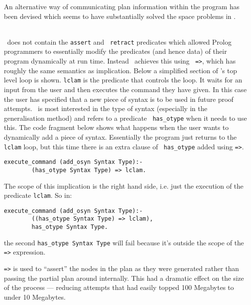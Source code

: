 An alternative way of communicating plan information within the
program has been devised which seems to have substantially solved the
space problems in \lclam.

 \\

\lprolog\ does not contain the {\tt assert} and {\tt
  retract} predicates which allowed Prolog programmers
to essentially modify the predicates (and hence data) of their program
dynamically at run time.  Instead \lprolog\ achieves this using {\tt
  =>}\index{{\tt =>}}, which has roughly the same semantics as
implication.  Below a simplified section of \lclam's top level loop is
shown.  {\tt lclam} is the predicate that controls the
loop.  It waits for an input from the user and then executes the
command they have given.  In this case the user has specified that a
new piece of syntax is to be used in future proof attempts.  \lclam\ is
most interested in the type of syntax (especially in the
generalisation method) and refers to a predicate {\tt
  has\_otype} when it needs to use this.  The code
fragment below shows what happens when the user wants to dynamically
add a piece of syntax.  Essentially the program just returns to the
{\tt lclam} loop, but this time there is an extra clause of {\tt
  has\_otype} added using {\tt =>}.

\begin{verbatim}
execute_command (add_osyn Syntax Type):-
        (has_otype Syntax Type) => lclam.
\end{verbatim}

The scope of this implication is the right hand side, i.e. just the
execution of the predicate {\tt lclam}. So in:
\begin{verbatim}
execute_command (add_osyn Syntax Type):-
        ((has_otype Syntax Type) => lclam),
        has_otype Syntax Type.
\end{verbatim}
the second {\tt has\_otype Syntax Type} will fail
because it's outside the scope of the {\tt =>}\index{{\tt =>}}
expression.

{\tt =>}\index{{\tt =>}} is used to ``assert'' the nodes in the plan
as they were generated rather than passing the partial plan around
internally.  This had a dramatic effect on the size of
the process --- reducing attempts that had easily topped 100 Megabytes
to under 10 Megabytes.

